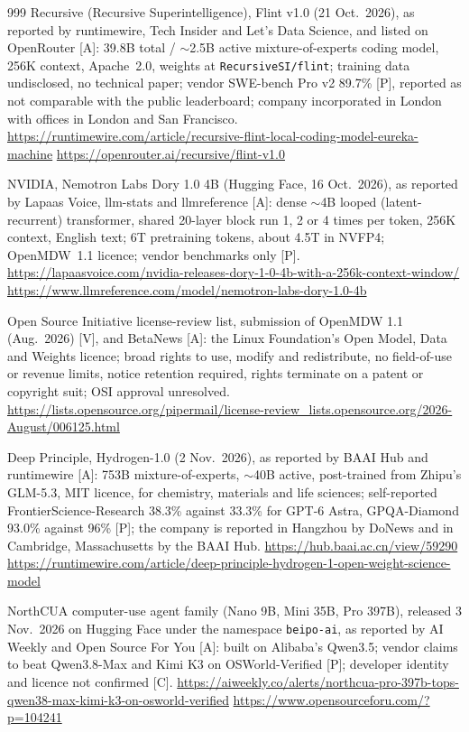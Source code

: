 \begin{thebibliography}{999}
 Recursive (Recursive Superintelligence), Flint v1.0 (21 Oct.\ 2026), as reported by runtimewire, Tech Insider and Let's Data Science, and listed on OpenRouter [A]: 39.8B total / $\sim$2.5B active mixture-of-experts coding model, 256K context, Apache~2.0, weights at \texttt{RecursiveSI/flint}; training data undisclosed, no technical paper; vendor SWE-bench Pro v2 89.7\% [P], reported as not comparable with the public leaderboard; company incorporated in London with offices in London and San Francisco. \url{https://runtimewire.com/article/recursive-flint-local-coding-model-eureka-machine} \url{https://openrouter.ai/recursive/flint-v1.0}

 NVIDIA, Nemotron Labs Dory 1.0 4B (Hugging Face, 16 Oct.\ 2026), as reported by Lapaas Voice, llm-stats and llmreference [A]: dense $\sim$4B looped (latent-recurrent) transformer, shared 20-layer block run 1, 2 or 4 times per token, 256K context, English text; 6T pretraining tokens, about 4.5T in NVFP4; OpenMDW~1.1 licence; vendor benchmarks only [P]. \url{https://lapaasvoice.com/nvidia-releases-dory-1-0-4b-with-a-256k-context-window/} \url{https://www.llmreference.com/model/nemotron-labs-dory-1.0-4b}

 Open Source Initiative license-review list, submission of OpenMDW 1.1 (Aug.\ 2026) [V], and BetaNews [A]: the Linux Foundation's Open Model, Data and Weights licence; broad rights to use, modify and redistribute, no field-of-use or revenue limits, notice retention required, rights terminate on a patent or copyright suit; OSI approval unresolved. \url{https://lists.opensource.org/pipermail/license-review_lists.opensource.org/2026-August/006125.html}

 Deep Principle, Hydrogen-1.0 (2 Nov.\ 2026), as reported by BAAI Hub and runtimewire [A]: 753B mixture-of-experts, $\sim$40B active, post-trained from Zhipu's GLM-5.3, MIT licence, for chemistry, materials and life sciences; self-reported FrontierScience-Research 38.3\% against 33.3\% for GPT-6 Astra, GPQA-Diamond 93.0\% against 96\% [P]; the company is reported in Hangzhou by DoNews and in Cambridge, Massachusetts by the BAAI Hub. \url{https://hub.baai.ac.cn/view/59290} \url{https://runtimewire.com/article/deep-principle-hydrogen-1-open-weight-science-model}

 NorthCUA computer-use agent family (Nano 9B, Mini 35B, Pro 397B), released 3 Nov.\ 2026 on Hugging Face under the namespace \texttt{beipo-ai}, as reported by AI Weekly and Open Source For You [A]: built on Alibaba's Qwen3.5; vendor claims to beat Qwen3.8-Max and Kimi K3 on OSWorld-Verified [P]; developer identity and licence not confirmed [C]. \url{https://aiweekly.co/alerts/northcua-pro-397b-tops-qwen38-max-kimi-k3-on-osworld-verified} \url{https://www.opensourceforu.com/?p=104241}


\end{thebibliography}
